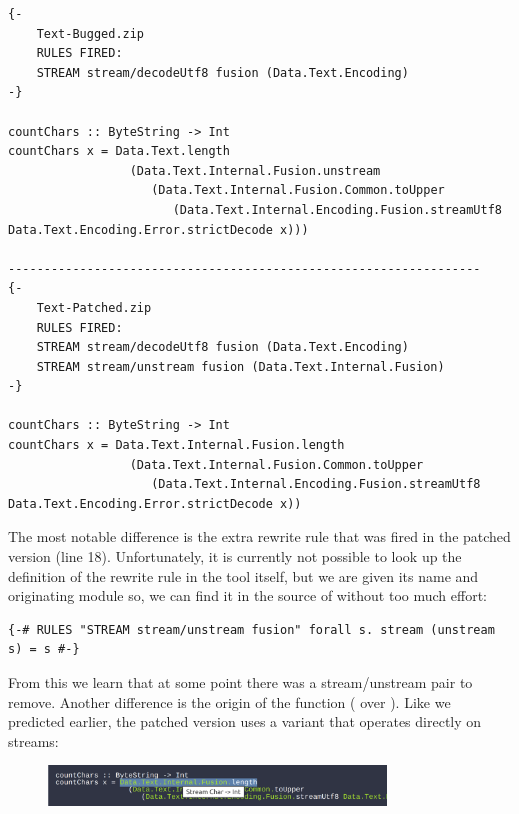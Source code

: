 \begin{listing}[H]
\begin{verbatim}
{-
    Text-Bugged.zip
    RULES FIRED:
    STREAM stream/decodeUtf8 fusion (Data.Text.Encoding)
-}

countChars :: ByteString -> Int
countChars x = Data.Text.length
                 (Data.Text.Internal.Fusion.unstream
                    (Data.Text.Internal.Fusion.Common.toUpper
                       (Data.Text.Internal.Encoding.Fusion.streamUtf8 Data.Text.Encoding.Error.strictDecode x)))

------------------------------------------------------------------
{-
    Text-Patched.zip
    RULES FIRED:
    STREAM stream/decodeUtf8 fusion (Data.Text.Encoding)
    STREAM stream/unstream fusion (Data.Text.Internal.Fusion)
-}

countChars :: ByteString -> Int
countChars x = Data.Text.Internal.Fusion.length
                 (Data.Text.Internal.Fusion.Common.toUpper
                    (Data.Text.Internal.Encoding.Fusion.streamUtf8 Data.Text.Encoding.Error.strictDecode x))
\end{verbatim}
\end{listing}

The most notable difference is the extra rewrite rule that was fired in the patched version (line 18).
Unfortunately, it is currently not possible to look up the definition of the rewrite rule in the tool itself, but
we are given its name and originating module so, we can find it in the source of  without too much effort:

\begin{listing}[H]
\begin{verbatim}
{-# RULES "STREAM stream/unstream fusion" forall s. stream (unstream s) = s #-}
\end{verbatim}
\end{listing}

From this we learn that at some point there was a stream/unstream pair to remove. Another difference is the origin
of the  function ( over ). Like we predicted earlier,
the patched version uses a variant that operates directly on streams:

\begin{figure}[H]
\centering
\includegraphics[width=0.8\textwidth]{figs/countchars_7.png}
\end{figure}

